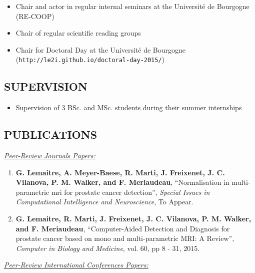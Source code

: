 {\begin{itemize}
\item Chair and actor in regular internal seminars at the Universit\'e de Bourgogne (RE-COOP)
\item Chair of regular scientific reading groups
\item Chair for Doctoral Day at the Universit\'e de Bourgogne (\texttt{http://le2i.github.io/doctoral-day-2015/})
\end{itemize}

\subsection{SUPERVISION}

\begin{itemize}
\item Supervision of 3 BSc. and MSc. students during their summer internships
\end{itemize}

\subsection{PUBLICATIONS}

\underline{\textit{Peer-Review Journals Papers:}}

\begin{enumerate}
\item \textbf{G. Lemaitre, A. Meyer-Baese, R. Marti, J. Freixenet, J. C. Vilanova, P. M. Walker, and F. Meriaudeau}, ``Normalisation in multi-parametric \ac{mri} for prostate cancer detection'', \textit{Special Issues in Computational Intelligence and Neuroscience}, To Appear.
\item \textbf{G. Lemaitre, R. Marti, J. Freixenet, J. C. Vilanova, P. M. Walker, and F. Meriaudeau}, ``Computer-Aided Detection and Diagnosis for prostate cancer based on mono and multi-parametric MRI: A Review'', \textit{Computer in Biology and Medicine}, vol. 60, pp 8 - 31, 2015.
\end{enumerate}

\underline{\textit{Peer-Review International Conferences Papers:}}

}
